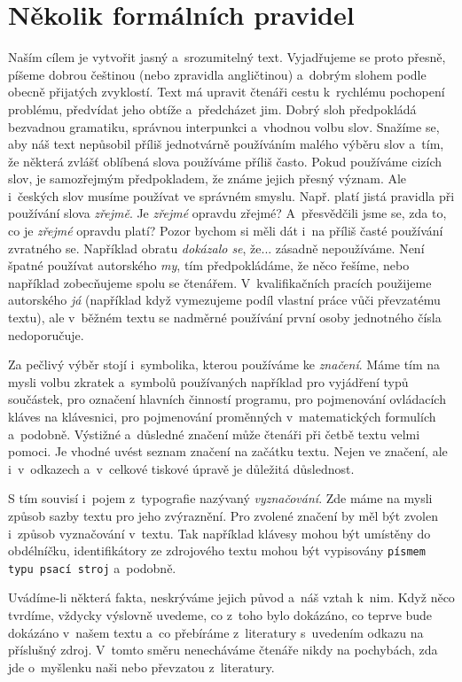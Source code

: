 \documentclass[english,cover]{fitthesis} %
\begin{document}
\chapter{Několik formálních pravidel}
Naším cílem je vytvořit jasný a~srozumitelný text. Vyjadřujeme se proto přesně, píšeme dobrou češtinou (nebo zpravidla angličtinou) a~dobrým slohem podle obecně přijatých zvyklostí. Text má upravit čtenáři cestu k~rychlému pochopení problému, předvídat jeho obtíže a~předcházet jim. Dobrý sloh předpokládá bezvadnou gramatiku, správnou interpunkci a~vhodnou volbu slov. Snažíme se, aby náš text nepůsobil příliš jednotvárně používáním malého výběru slov a~tím, že některá zvlášť oblíbená slova používáme příliš často. Pokud používáme cizích slov, je samozřejmým předpokladem, že známe jejich přesný význam. Ale i~českých slov musíme používat ve správném smyslu. Např. platí jistá pravidla při používání slova {\it zřejmě}. Je {\it zřejmé} opravdu zřejmé? A~přesvědčili jsme se, zda to, co je {\it zřejmé} opravdu platí? Pozor bychom si měli dát i~na příliš časté používání zvratného se. Například obratu {\it dokázalo se}, že... zásadně nepoužíváme. Není špatné používat autorského {\it my}, tím předpokládáme, že něco řešíme, nebo například zobecňujeme spolu se čtenářem. V~kvalifikačních pracích použijeme autorského {\it já} (například když vymezujeme podíl vlastní práce vůči převzatému textu), ale v~běžném textu se nadměrné používání první osoby jednotného čísla nedoporučuje.

Za pečlivý výběr stojí i~symbolika, kterou používáme ke {\it značení}. Máme tím na mysli volbu zkratek a~symbolů používaných například pro vyjádření typů součástek, pro označení hlavních činností programu, pro pojmenování ovládacích kláves na klávesnici, pro pojmenování proměnných v~matematických formulích a~podobně. Výstižné a~důsledné značení může čtenáři při četbě textu velmi pomoci. Je vhodné uvést seznam značení na začátku textu. Nejen ve značení, ale i~v~odkazech a~v~celkové tiskové úpravě je důležitá důslednost.

S tím souvisí i~pojem z~typografie nazývaný {\it vyznačování}. Zde máme na mysli způsob sazby textu pro jeho zvýraznění. Pro zvolené značení by měl být zvolen i~způsob vyznačování v~textu. Tak například klávesy mohou být umístěny do obdélníčku, identifikátory ze zdrojového textu mohou být vypisovány {\tt písmem typu psací stroj} a~podobně.

Uvádíme-li některá fakta, neskrýváme jejich původ a~náš vztah k~nim. Když něco tvrdíme, vždycky výslovně uvedeme, co z~toho bylo dokázáno, co teprve bude dokázáno v~našem textu a~co přebíráme z~literatury s~uvedením odkazu na příslušný zdroj. V~tomto směru nenecháváme čtenáře nikdy na pochybách, zda jde o~myšlenku naši nebo převzatou z~literatury.
\end{document}
